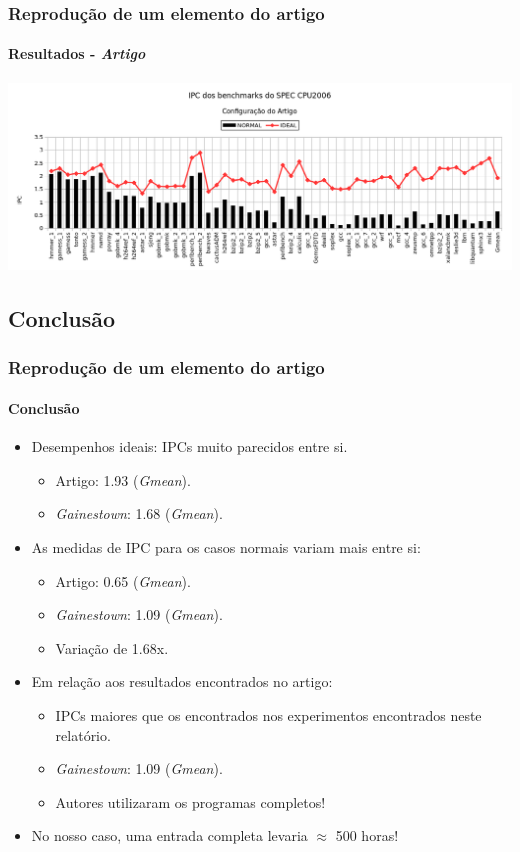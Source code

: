 \documentclass[10pt]{beamer}
\begin{document}
\begin{frame}
\frametitle{Reprodução de um elemento do artigo}
\framesubtitle{Resultados - \textit{Artigo}}

\centering
\includegraphics[width=\textwidth]{images/article}

\end{frame}

\subsection{Conclusão}
\begin{frame}
\frametitle{Reprodução de um elemento do artigo}
\framesubtitle{Conclusão}


\begin{itemize}
\item Desempenhos ideais: IPCs muito parecidos entre si.
\begin{itemize}
    \item Artigo: 1.93 (\textit{Gmean}).
    \item \textit{Gainestown}: 1.68 (\textit{Gmean}).  
 \end{itemize}
 \vspace{10pt}
\item As medidas de IPC para os casos normais variam mais
entre si: 
\begin{itemize}
    \item Artigo: 0.65 (\textit{Gmean}).
    \item \textit{Gainestown}: 1.09 (\textit{Gmean}).  
    \item Variação de 1.68x.
 \end{itemize}
\vspace{10pt}
\item Em relação aos resultados encontrados no artigo:
\begin{itemize}
    \item IPCs maiores que os encontrados nos experimentos encontrados neste
    relatório.
    \item \textit{Gainestown}: 1.09 (\textit{Gmean}).  
    \item Autores utilizaram os programas completos! 
 \end{itemize}
 \vspace{10pt}
 \item No nosso caso, uma entrada completa levaria \(\approx\) 500 horas!
\end{itemize}
\end{frame}
\end{document}
